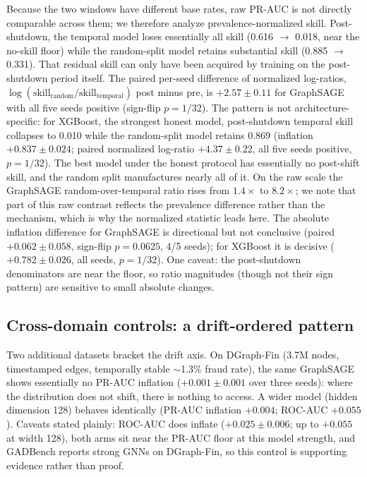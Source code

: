\documentclass{article}
\begin{document}
Because the two windows have different base rates, raw PR-AUC is not directly
comparable across them; we therefore analyze prevalence-normalized skill.
Post-shutdown, the temporal model loses essentially all skill (0.616
$\rightarrow$ 0.018, near the no-skill floor) while the random-split model
retains substantial skill (0.885 $\rightarrow$ 0.331). That residual skill can
only have been acquired by training on the post-shutdown period itself. The
paired per-seed difference of normalized log-ratios,
$\log(\mathrm{skill_{random}}/\mathrm{skill_{temporal}})$ post minus pre, is
$+2.57\pm0.11$ for GraphSAGE with all five seeds positive (sign-flip $p=1/32$).
The pattern is not architecture-specific: for XGBoost, the strongest honest
model, post-shutdown temporal skill collapses to 0.010 while the random-split
model retains 0.869 (inflation $+0.837\pm0.024$; paired normalized log-ratio
$+4.37\pm0.22$, all five seeds positive, $p=1/32$). The best model under the
honest protocol has essentially no post-shift skill, and the random split
manufactures nearly all of it. On the raw scale the GraphSAGE
random-over-temporal ratio rises from $1.4\times$ to $8.2\times$; we note that
part of this raw contrast reflects the prevalence difference rather than the
mechanism, which is why the normalized statistic leads here. The absolute
inflation difference for GraphSAGE is directional but not conclusive (paired
$+0.062\pm0.058$, sign-flip $p=0.0625$, 4/5 seeds); for XGBoost it is decisive
($+0.782\pm0.026$, all seeds, $p=1/32$). One caveat: the post-shutdown
denominators are near the floor, so ratio magnitudes (though not their sign
pattern) are sensitive to small absolute changes.

\subsection{Cross-domain controls: a drift-ordered pattern}
\label{sec:dose}
Two additional datasets bracket the drift axis. On DGraph-Fin
\citep{huang2022dgraph} (3.7M nodes, timestamped edges, temporally stable
$\sim$1.3\% fraud rate), the same GraphSAGE shows essentially no PR-AUC inflation
($+0.001\pm0.001$ over three seeds): where the distribution does not shift, there
is nothing to access. A wider model (hidden dimension 128) behaves identically
(PR-AUC inflation $+0.004$; ROC-AUC $+0.055$). Caveats stated plainly: ROC-AUC
does inflate ($+0.025\pm0.006$; up to $+0.055$ at width 128), both arms sit near
the PR-AUC floor at this model strength, and GADBench reports strong GNNs on
DGraph-Fin, so this control is supporting evidence rather than proof.
\end{document}
